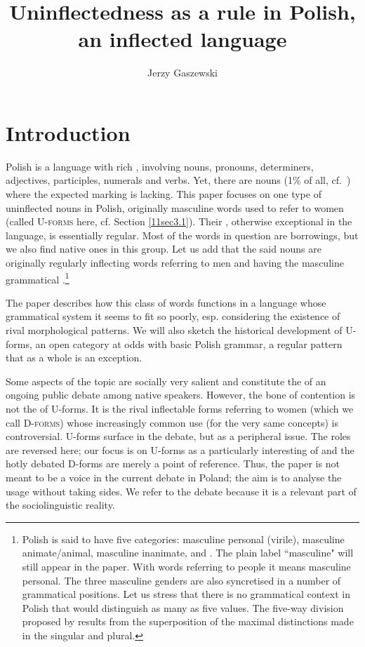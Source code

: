 \documentclass[output=paper,colorlinks,citecolor=brown]{langscibook}
\author{Jerzy Gaszewski\orcid{}\affiliation{University of Lodz}}
\title{Uninflectedness as a rule in Polish, an inflected language}
\begin{document}
\maketitle

\section{Introduction} 

Polish is a language with rich , involving nouns, pronouns, determiners, adjectives, participles, numerals and verbs. Yet, there are nouns (1\% of all, cf.~\citealt[159]{stefanczyk2007}) where the expected marking is lacking. This paper focuses on one type of uninflected nouns in Polish, originally masculine words used to refer to women (called \textsc{U-forms} here, cf. Section \ref{11sec3.1}). Their , otherwise exceptional in the language, is essentially regular. Most of the words in question are borrowings, but we also find native ones in this group. Let us add that the said nouns are originally regularly inflecting words referring to men and having the masculine grammatical .\footnote{Polish is said to have five  categories: masculine personal (virile), masculine animate/animal, masculine inanimate,  and . The plain label ``masculine" will still appear in the paper. With words referring to people it means masculine personal. The three masculine genders are also syncretised in a number of grammatical positions. Let us stress that there is no grammatical context in Polish that would distinguish as many as five  values. The five-way division proposed by \citet{manczak1956} results from the superposition of the maximal distinctions made	in the  singular and plural.\label{11ftn1}}

The paper describes how this class of words functions in a language whose grammatical system it seems to fit so poorly, esp. considering the existence of rival morphological patterns. We will also sketch the historical development of U-forms, an open category at odds with basic Polish grammar, a regular pattern that as a whole is an exception.

Some aspects of the topic are socially very salient and constitute the  of an ongoing public debate among native speakers. However, the bone of contention is not the  of U-forms. It is the rival inflectable forms referring to women (which we call \textsc{D-forms}) whose increasingly common use (for the very same concepts) is controversial. U-forms surface in the debate, but as a peripheral issue. The roles are reversed here; our focus is on U-forms as a particularly interesting  of  and the hotly debated D-forms are merely a point of reference. Thus, the paper is not meant to be a voice in the current debate in Poland; the aim is to analyse the usage without taking sides. We refer to the debate because it is a relevant part of the sociolinguistic reality.
\end{document}
